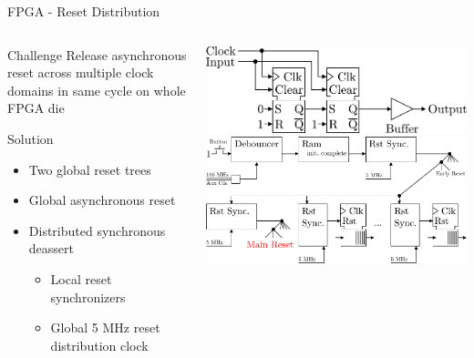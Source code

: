 \documentclass[10pt]{beamer}
\begin{document}
\begin{frame}{FPGA - Reset Distribution}
  \begin{columns}[T]
    \begin{column}{.4\textwidth}
      \begin{block}{Challenge}
        Release asynchronous reset across multiple
        clock domains in same cycle on whole FPGA die
      \end{block}

      \begin{block}{Solution}
        \begin{itemize}
        \item Two global reset trees
        \item Global asynchronous reset
        \item Distributed synchronous deassert
          \begin{itemize}
          \item Local reset synchronizers
          \item Global 5 MHz reset distribution clock
          \end{itemize}
        \end{itemize}
      \end{block}
    \end{column}
    \begin{column}{.6\textwidth}
      \vspace{6mm}
      \includegraphics[width=\textwidth]{figures/RstSync} \\
      \vspace{10mm}
      \includegraphics[width=\textwidth]{figures/rst_generation}
    \end{column}
  \end{columns}
\end{frame}
\end{document}
